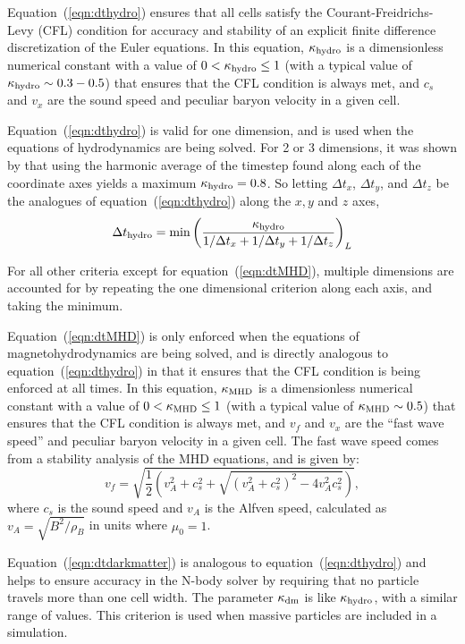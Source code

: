 Equation~(\ref{eqn:dthydro}) ensures that all cells satisfy the
Courant-Freidrichs-Levy (CFL) condition for accuracy and stability of
an explicit finite difference discretization of the Euler equations.
In this equation, $\kappa_{\rm hydro}$ is a dimensionless
numerical constant with a value of $0 < \kappa_{\rm hydro} \leq 1$
(with a typical value of $\kappa_{\rm hydro} \sim 0.3-0.5$) that
ensures that the CFL condition is always met, and $c_s$ and $v_x$ are
the sound speed and peculiar baryon velocity in a given cell.

Equation~(\ref{eqn:dthydro}) is valid for one dimension, and is used
when the equations of hydrodynamics are being solved.  For 2 or 3
dimensions, it was shown by \cite{Godunov1959}  that using the
harmonic average of the timestep found along each of the coordinate
axes yields a maximum $\kappa_{\rm hydro} = 0.8$.  So letting $\Delta
t_x$, $\Delta t_y$, and $\Delta t_z$ be the analogues of
equation~(\ref{eqn:dthydro}) along the $x,y$ and $z$ axes, 
\begin{equation}
  \Delta t_{\rm hydro} = \min \left( \frac{\kappa_{\rm hydro}} {1/\Delta t_x
  +1/\Delta t_y + 1/\Delta t_z} \right)_L
\end{equation}

For all other criteria except for equation~(\ref{eqn:dtMHD}), multiple dimensions are accounted for by
repeating the one dimensional criterion along each axis, and taking the minimum.

Equation~(\ref{eqn:dtMHD}) is only enforced when the equations of
magnetohydrodynamics are being solved, and is directly analogous to
equation~(\ref{eqn:dthydro}) in that it ensures that the CFL condition
is being enforced at all times.  In this equation, $\kappa_{\rm MHD}$
is a dimensionless
numerical constant with a value of $0 < \kappa_{\rm MHD} \leq 1$ (with a
typical value of $\kappa_{\rm MHD} \sim 0.5$) that ensures that the CFL
condition is always met, and $v_f$ and $v_x$ are the ``fast wave
speed'' and peculiar baryon velocity in a given cell.  The fast wave
speed comes from a stability analysis of the MHD equations, and is
given by:
%
\begin{equation}
v_f = \sqrt{ \frac{1}{2} \left(  v_A^2 + c_s^2 + \sqrt{(v_A^2 +
      c_s^2)^2 - 4 v_A^2 c_s^2}  \right)  },
\label{eqn:vfastmhd}
\end{equation}
%
where $c_s$ is the sound speed and $v_A$ is the Alfven speed, calculated
as $v_A = \sqrt{B^2/\rho_B}$ in units where $\mu_0 = 1$.

Equation~(\ref{eqn:dtdarkmatter}) is analogous to
equation~(\ref{eqn:dthydro}) and helps to ensure accuracy in the N-body solver
by requiring that no particle travels more than one cell
width.  The parameter $\kappa_{\rm dm}$ is like $\kappa_{\rm
hydro}$, with a similar range of values.  This criterion is used when
massive particles are included in a simulation.

